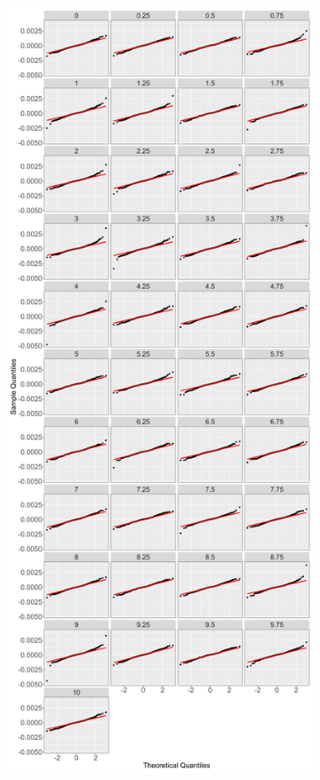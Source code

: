 \begin{figure}[!htbp]
\begin{subfigure}{0.49\textwidth}
        \label{fig:qq poly model p 2}
    \end{subfigure}
    \hfill
    \begin{subfigure}{0.49\textwidth}
        \centering
        \captionsetup{justification=centering}
        \includegraphics[width=\textwidth]{Figures/Model Checking/zero_coupon_yields_phase_3_HJM_2F_procedure_2_spline_model_qq_plot.png}

\end{subfigure}
\end{figure}
